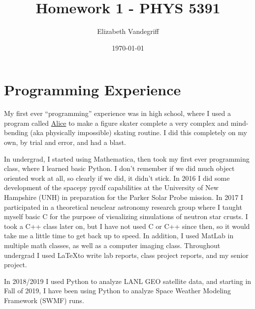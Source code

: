 \documentclass[12pt, letterpaper]{article}
\begin{document}
\title{Homework 1 - PHYS 5391}
\author{Elizabeth Vandegriff}
\date{\today}

\maketitle
\newpage
\tableofcontents
\newpage

\section{Programming Experience}


My first ever ``programming'' experience was in high school, where I  used a program called \href{https://www.alice.org/}{Alice} to make a figure skater complete a very complex and mind-bending (aka physically impossible) skating routine. I did this completely on my own, by trial and error, and had a blast.

In undergrad, I started using Mathematica, then took my first ever programming class, where I learned basic Python. I don't remember if we did much object oriented work at all, so clearly if we did, it didn't stick. In 2016 I did some development of the spacepy pycdf capabilities at the University of New Hampshire (UNH) in preparation for the Parker Solar Probe mission. In 2017 I participated in a theoretical neuclear astronomy research group where I taught myself basic C for the purpose of visualizing simulations of neutron star crusts. I took a C++ class later on, but I have not used C or C++ since then, so it would take me a little time to get back up to speed. In addition, I used MatLab in multiple math classes, as well as a computer imaging class. Throughout undergrad I used \LaTeX to write lab reports, class project reports, and my senior project.

In 2018/2019 I used Python to analyze LANL GEO satellite data, and starting in Fall of 2019, I have been using Python to analyze Space Weather Modeling Framework (SWMF) runs.
\end{document}
